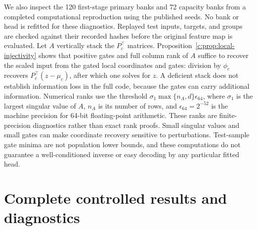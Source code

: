 We also inspect the 120 first-stage primary banks and 72 capacity banks from a
completed computational reproduction using the published seeds. No bank or head is
refitted for these diagnostics. Replayed test inputs, targets, and groups are checked
against their recorded hashes before the original feature map is evaluated.
Let $A$ vertically stack the $P_c^\top$ matrices. Proposition~\ref{c:prop:local-injectivity}
shows that positive gates and full column rank of $A$ suffice to recover the scaled
input from the gated local coordinates and gates:
division by $\phi_c$ recovers $P_c^\top(z-\mu_c)$, after which one solves for $z$.
A deficient stack does not establish information loss in the full code, because the
gates can carry additional information. Numerical ranks use the threshold
$\sigma_1\max\{n_A,d\}\epsilon_{64}$, where $\sigma_1$ is the largest
singular value of $A$, $n_A$ is its number of rows, and
$\epsilon_{64}=2^{-52}$ is the machine precision for 64-bit floating-point
arithmetic. These ranks are finite-precision diagnostics rather than exact
rank proofs. Small singular values and small gates can make coordinate
recovery sensitive to perturbations. Test-sample gate minima are not population
lower bounds, and these computations do not guarantee a well-conditioned inverse
or easy decoding by any particular fitted head.
\begin{table}[htbp]
\caption{Retrospective diagnostics over 24 stored banks per row. Rank ranges concern
the stacked local bases in input dimension $d$. The smallest singular value and
gate entries are minima over the inspected banks (and, for gates, their original
test observations). The condition number $\kappa_2$ is the ratio of the
largest to the smallest singular value for a full-column-rank stack; the
table reports its maximum over the inspected banks. A dash means
that not every stack in that row has full numerical column rank. KAHM and affine
representations share the basis stack. Computational reproduction supplies no new
independent statistical replications.}
\label{c:tab:review-banks}
\centering\small\setlength{\tabcolsep}{3pt}

\end{table}


\clearpage
\section{Complete controlled results and diagnostics}\label{c:app:tables}

\begin{table}[!htbp]
 \caption{The six primary branch settings at 1,024 training points:
 mean ridge test MSE over 24 repetitions, with the primary KAHM advantage
 $G$ and its interval from the 29-comparison family. The Bayes MSE is
 $1/300$. The affine-locality scoring control reuses the shared references
 and is secondary.}
 \label{c:tab:branch}
 \centering\small\setlength{\tabcolsep}{3pt}
 
\end{table}

